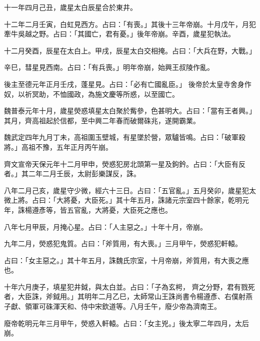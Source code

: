 \begin{pinyinscope}
 十一年四月己丑，歲星太白辰星合於東井。



 十二年二月壬寅，白虹見西方。占曰：「有喪。」其後十三年帝崩。十月戊午，月犯牽牛吳越之野。占曰：「其國亡，君有憂。」後年帝崩。辛酉，歲星犯執法。



 十二月癸酉，辰星在太白上。甲戌，辰星太白交相掩。占曰：「大兵在野，大戰。」



 辛巳，彗星見西南。占曰：「有兵喪。」明年帝崩，始興王叔陵作亂。



 後主至德元年正月壬戌，蓬星見。占曰：「必有亡國亂臣。」
 後帝於太皇寺舍身作奴，以祈冥助，不恤國政，為施文慶等所惑，以至國亡。



 魏普泰元年十月，歲星熒惑填星太白聚於觜參，色甚明大。占曰：「當有王者興。」其月，齊高祖起於信都，至中興二年春而破爾硃兆，遂開霸業。



 魏武定四年九月丁未，高祖圍玉壁城，有星墜於營，眾驢皆鳴。占曰：「破軍殺將。」高祖不豫，五年正月丙午崩。



 齊文宣帝天保元年十二月甲申，熒惑犯房北頭第一星及鉤鈐。占曰：「大臣有反者。」其二年二月壬辰，太尉彭樂謀反，誅。



 八年二月己亥，歲星守少微，經六十三日。占曰：「五官亂。」五月癸卯，歲星犯太微上將。占曰：「大將憂，大臣死。」其十年五月，誅諸元宗室四十餘家，乾明元年，誅楊遵彥等，皆五官亂，大將憂，大臣死之應也。



 八年七月甲辰，月掩心星。占曰：「人主惡之。」十年十月，帝崩。



 九年二月，熒惑犯鬼質。占曰：「斧質用，有大喪。」三月甲午，熒惑犯軒轅。



 占曰：「女主惡之。」其十年五月，誅魏氏宗室，十月帝崩，斧質用，有大喪之應也。



 十年六月庚子，填星犯井鉞，與太白並。占曰：「子為玄枵，
 齊之分野，君有戮死者，大臣誅，斧鉞用。」其明年二月乙巳，太師常山王誅尚書令楊遵彥、右僕射燕子獻、領軍可硃渾天和、侍中宋欽道等。八月壬午，廢少帝為濟南王。



 廢帝乾明元年三月甲午，熒惑入軒轅。占曰：「女主兇。」後太寧二年四月，太后崩。




\end{pinyinscope}
